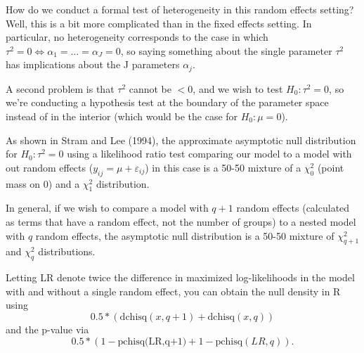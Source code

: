 \documentclass[ignorenonframetext,]{beamer}
\begin{document}
\begin{frame}{}

How do we conduct a formal test of heterogeneity in this random effects
setting? Well, this is a bit more complicated than in the fixed effects
setting. In particular, no heterogeneity corresponds to the case in
which \(\tau^2=0 \iff \alpha_1=\ldots=\alpha_J=0\), so saying something
about the single parameter \(\tau^2\) has implications about the J
parameters \(\alpha_j\).

A second problem is that \(\tau^2\) cannot be \(<0\), and we wish to
test \(H_0: \tau^2=0\), so we're conducting a hypothesis test at the
boundary of the parameter space instead of in the interior (which would
be the case for \(H_0: \mu=0\)).

\end{frame}

\begin{frame}{}

As shown in Stram and Lee (1994), the approximate asymptotic null
distribution for \(H_0: \tau^2=0\) using a likelihood ratio test
comparing our model to a model with out random effects
(\(y_{ij}=\mu+\varepsilon_{ij}\)) in this case is a 50-50 mixture of a
\(\chi^2_0\) (point mass on 0) and a \(\chi_1^2\) distribution.

\end{frame}

\begin{frame}{}

In general, if we wish to compare a model with \(q+1\) random effects
(calculated as terms that have a random effect, not the number of
groups) to a nested model with \(q\) random effects, the asymptotic null
distribution is a 50-50 mixture of \(\chi^2_{q+1}\) and \(\chi^2_q\)
distributions.

\end{frame}

\begin{frame}{}

Letting LR denote twice the difference in maximized log-likelihoods in
the model with and without a single random effect, you can obtain the
null density in R using
\[0.5*(\text{dchisq}(x,q+1)+\text{dchisq}(x,q))\] and the p-value via
\[0.5*(1-\text{pchisq(LR,q+1)}+1-\text{pchisq}(LR,q)).\]

\end{frame}
\end{document}
